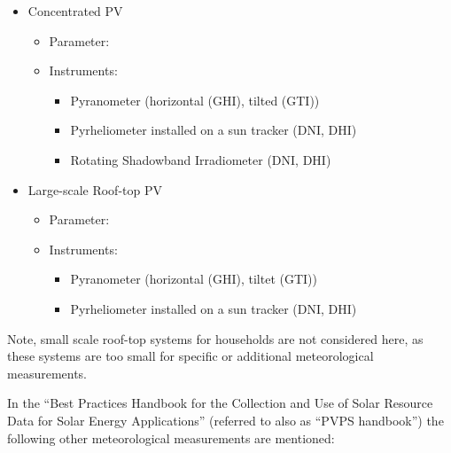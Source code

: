 \begin{itemize}
    \item Concentrated PV
        \begin{itemize}
            \item Parameter: 
            \item Instruments: 
            \begin{itemize}
                \item Pyranometer (horizontal (GHI), tilted (GTI))
                \item Pyrheliometer installed on a sun tracker (DNI, DHI)
            \item Rotating Shadowband Irradiometer (DNI, DHI)
            \end{itemize}
        \end{itemize}
    \item Large-scale Roof-top PV
        \begin{itemize}
        \item Parameter: 
        \item Instruments: 
            \begin{itemize}
                \item Pyranometer (horizontal (GHI), tiltet (GTI))
                \item Pyrheliometer installed on a sun tracker (DNI, DHI)
            \end{itemize}
        \end{itemize}
\end{itemize}

Note, small scale roof-top systems for households are not considered here, as these systems are too small for specific or additional meteorological measurements.

In the ``Best Practices Handbook  for the Collection and Use  of Solar Resource Data for Solar Energy Applications'' (referred to also as ``PVPS handbook'') \cite{nrelhandbook2021} the following other meteorological measurements are mentioned: 

